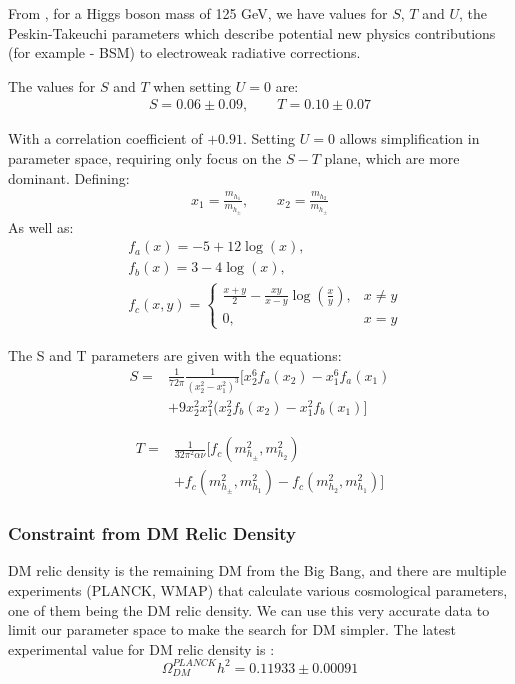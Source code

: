 \documentclass[12pt]{article}
\begin{document}
From \cite{gfitter2014global}, for a Higgs boson mass of 125 GeV, we have values for $S$, $T$ and $U$, the Peskin-Takeuchi parameters \cite{PeskinTakeuchi1990} which describe potential new physics contributions (for example - BSM) to electroweak radiative corrections.

 The values for $S$ and $T$ when setting $U = 0$ are:
 \begin{align}
     S = 0.06 \pm0.09, \qquad
     T = 0.10\pm0.07
 \end{align}

With a correlation coefficient of $+0.91$. Setting $U = 0$ allows simplification in parameter space, requiring only focus on the $S-T$ plane, which are more dominant. Defining:
\begin{align}
    x_1 = \frac{m_{h_1}}{m_{h_\pm}}, \qquad 
    x_2 = \frac{m_{h_2}}{m_{h_\pm}}
\end{align}
As well as:
\begin{align}
    &f_a(x) = -5 +12\log(x), \qquad
    \\&f_b(x) = 3-4\log(x),
    \\
    &f_c(x,y) = 
    \begin{cases}
        \frac{x+y}{2}-\frac{xy}{x-y}\log{\left(\frac{x}{y}\right)}, & x\neq y\\
        0, & x = y
    \end{cases}
\end{align}

The S and T parameters are given with the equations:
\begin{equation}
    \begin{split}
           S =& \frac{1}{72\pi}\frac{1}{(x^2_2 - x^2_1)^3}[x^6_2f_a(x_2)-x^6_1f_a(x_1)
            \\&+ 9x_2^2x_1^2(x_2^2f_b(x_2)-x^2_1f_b(x_1)] 
    \end{split}
    \label{eqn:S}
\end{equation}

\begin{equation}
    \begin{split}
        T = &\frac{1}{32\pi^2\alpha\nu}[f_c(m^2_{h_\pm},m^2_{h_2})
            \\&+ f_c(m^2_{h_\pm},m^2_{h_1}) - f_c(m^2_{h_2},m^2_{h_1})]
    \end{split}
    \label{eqn:T}
\end{equation}

\subsubsection{Constraint from DM Relic Density}
\label{sec:relic density}
DM relic density is the remaining DM from the Big Bang, and there are multiple experiments (PLANCK, WMAP) that calculate various cosmological parameters, one of them being the DM relic density. We can use this very accurate data to limit our parameter space to make the search for DM simpler. The latest experimental value for DM relic density is  \cite{Planck:2018vyg}:
\begin{equation}
    \Omega ^{PLANCK}_{DM} h^2 = 0.11933 \pm 0.00091
\end{equation}
\end{document}

